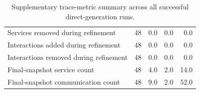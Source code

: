 \begin{table}[t]
{\begin{tabular}{lrrrr}
Services removed during refinement & 48 & 0.0 & 0.0 & 0.0 \\
Interactions added during refinement & 48 & 0.0 & 0.0 & 0.0 \\
Interactions removed during refinement & 48 & 0.0 & 0.0 & 0.0 \\
Final-snapshot service count & 48 & 4.0 & 2.0 & 14.0 \\
Final-snapshot communication count & 48 & 9.0 & 2.0 & 52.0 \\
\bottomrule
\end{tabular}
}
\caption{Supplementary trace-metric summary across all successful direct-generation runs.}
\label{tab:s2-direct-process-metrics}
\end{table}
